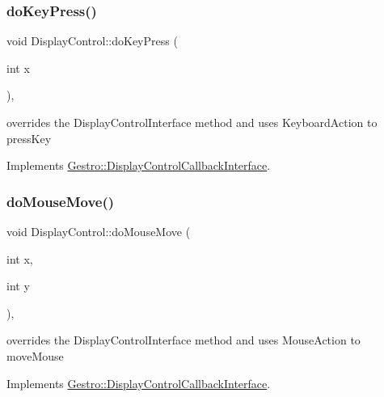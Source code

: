 \subsubsection{\texorpdfstring{do\+Key\+Press()}{doKeyPress()}}
{\footnotesize\ttfamily void Display\+Control\+::do\+Key\+Press (\begin{DoxyParamCaption}\item[{int}]{x }\end{DoxyParamCaption})\hspace{0.3cm}{\ttfamily [override]}, {\ttfamily [virtual]}}

overrides the Display\+Control\+Interface method and uses Keyboard\+Action to press\+Key 

Implements \hyperlink{classGestro_1_1DisplayControlCallbackInterface_aa6d1e75bb4b3aa0b0e10497576b1053f}{Gestro\+::\+Display\+Control\+Callback\+Interface}.

\mbox{\label{classGestro_1_1DisplayControl_aa8c509a1e17ba12d164dcfe43cf281d4}} 
\subsubsection{\texorpdfstring{do\+Mouse\+Move()}{doMouseMove()}}
{\footnotesize\ttfamily void Display\+Control\+::do\+Mouse\+Move (\begin{DoxyParamCaption}\item[{int}]{x,  }\item[{int}]{y }\end{DoxyParamCaption})\hspace{0.3cm}{\ttfamily [override]}, {\ttfamily [virtual]}}

overrides the Display\+Control\+Interface method and uses Mouse\+Action to move\+Mouse 

Implements \hyperlink{classGestro_1_1DisplayControlCallbackInterface_a35d453c78b578d061c89c95b3ae9ee8a}{Gestro\+::\+Display\+Control\+Callback\+Interface}.

\mbox{\label{classGestro_1_1DisplayControl_a25f685ea6bf001e53c7d17410f2a24ea}} 
